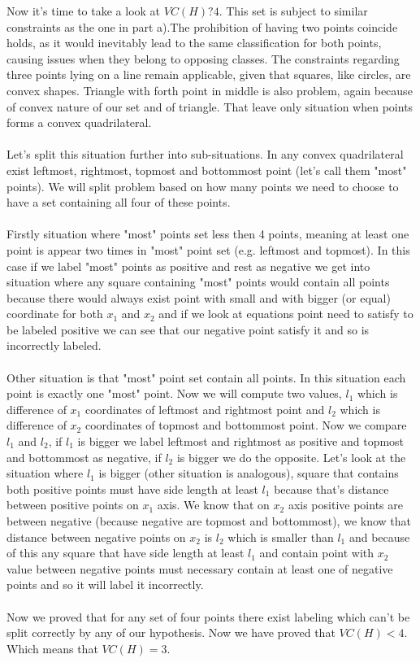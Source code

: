 \documentclass[a4paper]{article}
\begin{document}
	Now it's time to take a look at $VC(H) ? 4$. This set is subject to similar constraints as the one in part a).The prohibition of having two points coincide holds, as it would inevitably lead to the same classification for both points, causing issues when they belong to opposing classes. The constraints regarding three points lying on a line remain applicable, given that squares, like circles, are convex shapes. Triangle with forth point in middle is also problem, again because of convex nature of our set and of triangle. That leave only situation when points forms a convex quadrilateral.
	\\
	\\
	Let's split this situation further into sub-situations. In any convex quadrilateral exist leftmost, rightmost, topmost and bottommost point (let's call them "most" points). We will split problem based on how many points we need to choose to have a set containing all four of these points. 
	\\
	\\
	Firstly situation where "most" points set less then 4 points, meaning at least one point is appear two times in "most" point set (e.g. leftmost and topmost). In this case if we label "most" points as positive and rest as negative we get into situation where any square containing "most" points would contain all points because there would always exist point with small and with bigger (or equal) coordinate for both $x_1$ and $x_2$ and if we look at equations point need to satisfy to be labeled positive we can see that our negative point satisfy it and so is incorrectly labeled.
	\\
	\\
	Other situation is that "most" point set contain all points. In this situation each point is exactly one "most" point. Now we will compute two values, $l_1$ which is difference of $x_1$ coordinates of leftmost and rightmost point and $l_2$ which is difference of $x_2$ coordinates of topmost and bottommost point. Now we compare $l_1$ and $l_2$, if $l_1$ is bigger we label leftmost and rightmost as positive and topmost and bottommost as negative, if $l_2$ is bigger we do the opposite. Let's look at the situation where $l_1$ is bigger (other situation is analogous), square that contains both positive points must have side length at least $l_1$ because that's distance between positive points on $x_1$ axis. We know that on $x_2$ axis positive points are between negative (because negative are topmost and bottommost), we know that distance between negative points on $x_2$ is $l_2$ which is smaller than $l_1$ and because of this any square that have side length at least $l_1$ and contain point with $x_2$ value between negative points must necessary contain at least one of negative points and so it will label it incorrectly.
	\\
	\\
	Now we proved that for any set of four points there exist labeling which can't be split correctly by any of our hypothesis. Now we have proved that $VC(H) < 4$. Which means that  $VC(H) = 3$.
	
\end{document}
